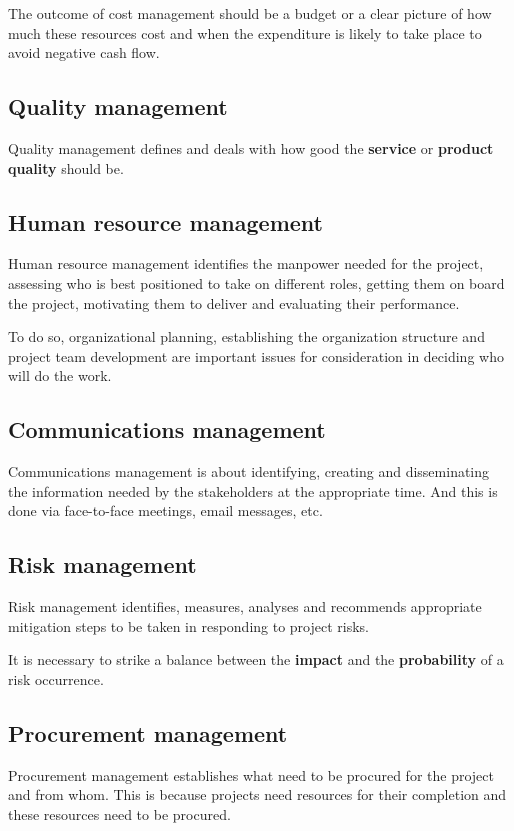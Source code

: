 \documentclass[math,code]{amznotes}
\theoremstyle{remark}
\begin{document}
The outcome of cost management should be a budget or a clear picture of how much these resources cost and when the expenditure is likely to take place to avoid negative cash flow.

\subsection{Quality management}
Quality management defines and deals with how good the \textbf{service} or \textbf{product quality} should be.

\subsection{Human resource management}
Human resource management identifies the manpower needed for the project, assessing who is best positioned to take on different roles, getting them on board the project, motivating them to deliver and evaluating their performance.

To do so, organizational planning, establishing the organization structure and project team development are important issues for consideration in deciding who will do the work.

\subsection{Communications management}
Communications management is about identifying, creating and disseminating the information needed by the stakeholders at the appropriate time. And this is done via face-to-face meetings, email messages, etc.

\subsection{Risk management}
Risk management identifies, measures, analyses and recommends appropriate mitigation steps to be taken in responding to project risks.

It is necessary to strike a balance between the \textbf{impact} and the \textbf{probability} of a risk occurrence.

\subsection{Procurement management}
Procurement management establishes what need to be procured for the project and from whom. This is because projects need resources for their completion and these resources need to be procured.
\end{document}
